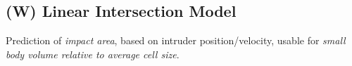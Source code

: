 \subsection{(W) Linear Intersection Model}\label{s:linearIntersectionModel}
    \noindent Prediction of \emph{impact area}, based on intruder position/velocity, usable for \emph{small body volume relative to average cell size}.
    

